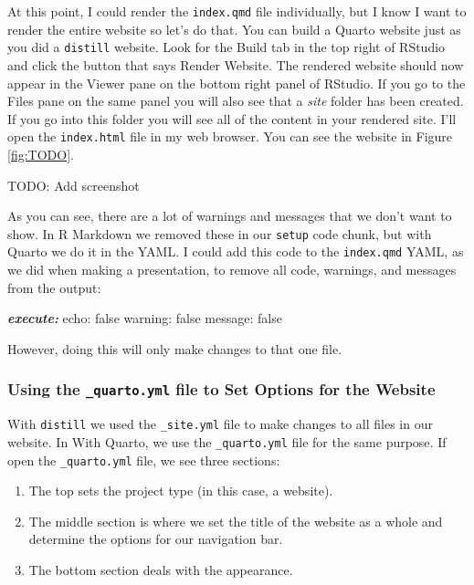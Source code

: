 \documentclass[
]{book}
\newenvironment{Shaded}{\begin{snugshade}}{\end{snugshade}}
\newcommand{\AnnotationTok}[1]{\textcolor[rgb]{0.56,0.35,0.01}{\textbf{\textit{#1}}}}
\newcommand{\CommentTok}[1]{\textcolor[rgb]{0.56,0.35,0.01}{\textit{#1}}}
\newcommand{\NormalTok}[1]{#1}
\providecommand{\tightlist}{%
  \setlength{\itemsep}{0pt}\setlength{\parskip}{0pt}}
\begin{document}
At this point, I could render the \texttt{index.qmd} file individually, but I know I want to render the entire website so let's do that. You can build a Quarto website just as you did a \texttt{distill} website. Look for the Build tab in the top right of RStudio and click the button that says Render Website. The rendered website should now appear in the Viewer pane on the bottom right panel of RStudio. If you go to the Files pane on the same panel you will also see that a \emph{site} folder has been created. If you go into this folder you will see all of the content in your rendered site. I'll open the \texttt{index.html} file in my web browser. You can see the website in Figure \ref{fig:TODO}.

TODO: Add screenshot

As you can see, there are a lot of warnings and messages that we don't want to show. In R Markdown we removed these in our \texttt{setup} code chunk, but with Quarto we do it in the YAML. I could add this code to the \texttt{index.qmd} YAML, as we did when making a presentation, to remove all code, warnings, and messages from the output:

\begin{Shaded}
\begin{Highlighting}[]
\AnnotationTok{execute:}\CommentTok{ }
\NormalTok{  echo: false}
\NormalTok{  warning: false}
\NormalTok{  message: false}
\end{Highlighting}
\end{Shaded}

However, doing this will only make changes to that one file.

\hypertarget{using-the-_quarto.yml-file-to-set-options-for-the-website}{%
\subsubsection*{\texorpdfstring{Using the \texttt{\_quarto.yml} file to Set Options for the Website}{Using the \_quarto.yml file to Set Options for the Website}}\label{using-the-_quarto.yml-file-to-set-options-for-the-website}}

With \texttt{distill} we used the \texttt{\_site.yml} file to make changes to all files in our website. In With Quarto, we use the \texttt{\_quarto.yml} file for the same purpose. If open the \texttt{\_quarto.yml} file, we see three sections:

\begin{enumerate}
\def\labelenumi{\arabic{enumi}.}
\tightlist
\item
  The top sets the project type (in this case, a website).
\item
  The middle section is where we set the title of the website as a whole and determine the options for our navigation bar.
\item
  The bottom section deals with the appearance.
\end{enumerate}
\end{document}

